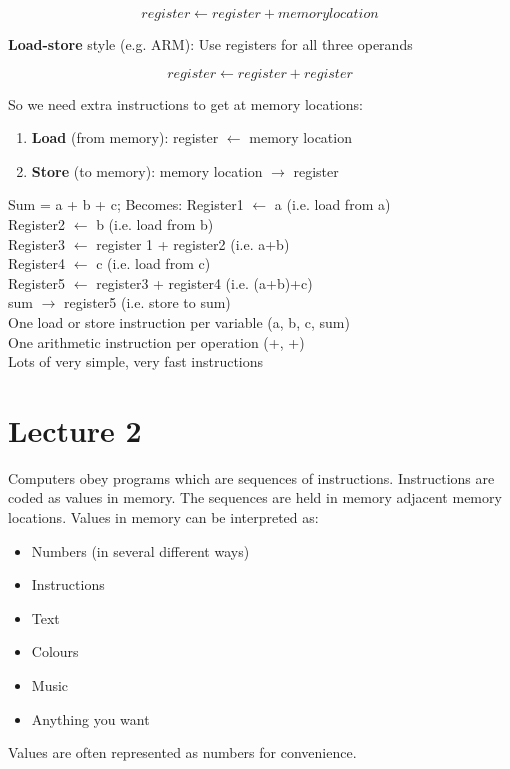 \documentclass{article}
\begin{document}
\[
	register \leftarrow register + memory location
\]

\textbf{Load-store} style (e.g. ARM): Use registers for all three operands

\[
	register \leftarrow register + register
\]

So we need extra instructions to get at memory locations:
\begin{enumerate}
	\item \textbf{Load} (from memory): register \(\leftarrow\) memory location
	\item \textbf{Store} (to memory): memory location \(\rightarrow\) register
\end{enumerate}

Sum = a + b + c;
Becomes:
Register1 \(\leftarrow\) a                      (i.e. load from a)\\
Register2 \(\leftarrow\) b                      (i.e. load from b)\\
Register3 \(\leftarrow\) register 1 + register2 (i.e. a+b)\\
Register4 \(\leftarrow\) c                      (i.e. load from c)\\
Register5 \(\leftarrow\) register3 + register4  (i.e. (a+b)+c)\\
sum \(\rightarrow\) register5                   (i.e. store to sum)\\
One load or store instruction per variable (a, b, c, sum)\\
One arithmetic instruction per operation (+, +)\\
Lots of very simple, very fast instructions

\section{Lecture 2}
Computers obey programs which are sequences of instructions. Instructions are coded as values in memory. The sequences are held in memory adjacent memory locations. Values in memory can be interpreted as:
\begin{itemize}
	\item Numbers (in several different ways)
	\item Instructions
	\item Text
	\item Colours
	\item Music
	\item Anything you want
\end{itemize}
Values are often represented as numbers for convenience.
\end{document}
